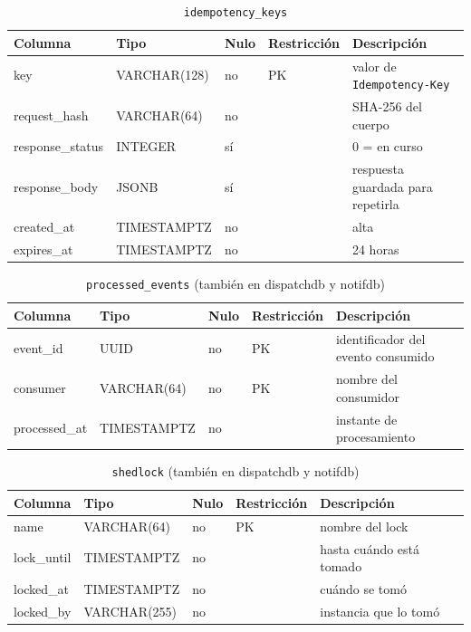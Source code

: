 \documentclass[conference]{IEEEtran}
\newcommand{\pkg}[1]{\texttt{#1}}
\begin{document}
\begin{table}[!t]
\centering
\caption{\pkg{idempotency\_keys}}

\begin{tabular}{@{}L{3.2cm}L{3.2cm}L{1.1cm}L{3.4cm}L{3.9cm}@{}}
\toprule
\textbf{Columna} & \textbf{Tipo} & \textbf{Nulo} & \textbf{Restricción} & \textbf{Descripción}\\
\midrule
key & VARCHAR(128) & no & PK & valor de \pkg{Idempotency-Key}\\
request\_hash & VARCHAR(64) & no & & SHA-256 del cuerpo\\
response\_status & INTEGER & sí & & 0 = en curso\\
response\_body & JSONB & sí & & respuesta guardada para repetirla\\
created\_at & TIMESTAMPTZ & no & & alta\\
expires\_at & TIMESTAMPTZ & no & & 24 horas\\
\bottomrule
\end{tabular}
\end{table}

\begin{table}[!t]
\centering
\caption{\pkg{processed\_events} (también en dispatchdb y notifdb)}

\begin{tabular}{@{}L{3.2cm}L{3.2cm}L{1.1cm}L{3.4cm}L{3.9cm}@{}}
\toprule
\textbf{Columna} & \textbf{Tipo} & \textbf{Nulo} & \textbf{Restricción} & \textbf{Descripción}\\
\midrule
event\_id & UUID & no & PK & identificador del evento consumido\\
consumer & VARCHAR(64) & no & PK & nombre del consumidor\\
processed\_at & TIMESTAMPTZ & no & & instante de procesamiento\\
\bottomrule
\end{tabular}
\end{table}

\begin{table}[!t]
\centering
\caption{\pkg{shedlock} (también en dispatchdb y notifdb)}

\begin{tabular}{@{}L{3.2cm}L{3.2cm}L{1.1cm}L{3.4cm}L{3.9cm}@{}}
\toprule
\textbf{Columna} & \textbf{Tipo} & \textbf{Nulo} & \textbf{Restricción} & \textbf{Descripción}\\
\midrule
name & VARCHAR(64) & no & PK & nombre del lock\\
lock\_until & TIMESTAMPTZ & no & & hasta cuándo está tomado\\
locked\_at & TIMESTAMPTZ & no & & cuándo se tomó\\
locked\_by & VARCHAR(255) & no & & instancia que lo tomó\\
\bottomrule
\end{tabular}
\end{table}
\end{document}
